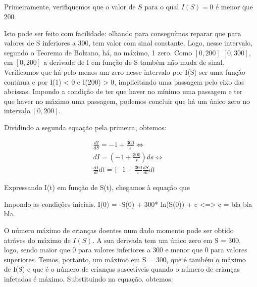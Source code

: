 \documentclass[portuguese, a4paper]{article}
\begin{document}
	\subsection{}
		\subsubsection{}
		\par %
		Primeiramente, verifiquemos que o valor de $S$ para o qual $I(S) = 0$ é menor que 200.
		\par
		Isto pode ser feito com facilidade: olhando para  conseguímos reparar que para valores
		de S inferiores a 300, tem valor com sinal constante. Logo, nesse intervalo, segundo o Teorema de Bolzano,
		há, no máximo, 1 zero. Como $[0, 200]$ \subset $[0, 300]$, em $[0, 200]$ a derivada de I em função de S também não muda de sinal.
		Verificamos que há pelo menos um zero nesse intervalo por I(S) ser uma função contínua e por I(1) < 0 e I(200) > 0, 
		implicitando uma passagem pelo eixo das abcissas. Impondo a condição de ter que haver no mínimo uma passagem e ter que haver no máximo uma passagem, 
		podemos concluir que há um único zero no intervalo $[0, 200]$.
		\par
		Dividindo a segunda equação pela primeira, obtemos:

		\begin{equation} \label{di}
		\begin{split}
			\frac{dI}{dS} = -1 + \frac{300}{s} \Leftrightarrow \\
			dI = ( -1 + \frac{300}{s})ds \Leftrightarrow \\
			\frac{dI}{dt} dt = (-1 + \frac{300}{s} \frac{dS}{dt} dt

		\end{split}
		\end{equation}


		Expressando I(t) em função de S(t), chegamos à equação que

		Impondo as condições iniciais. 
		I(0) = -S(0) + 300* ln(S(0)) + c <=> c = bla bla bla


		O número máximo de crianças doentes num dado momento pode ser obtido
		atráves do máximo de $I(S)$. A sua derivada tem um único zero em S = 300, 
		logo, sendo maior que 0 para valores inferiores a 300 e menor que 0 para valores superiores.
		Temos, portanto, um máximo em S = 300, que é também o máximo de I(S) e que é
		o número de crianças suscetíveis quando o número de crianças infetadas é máximo.
		Substituindo na equação, obtemos:
\end{document}
